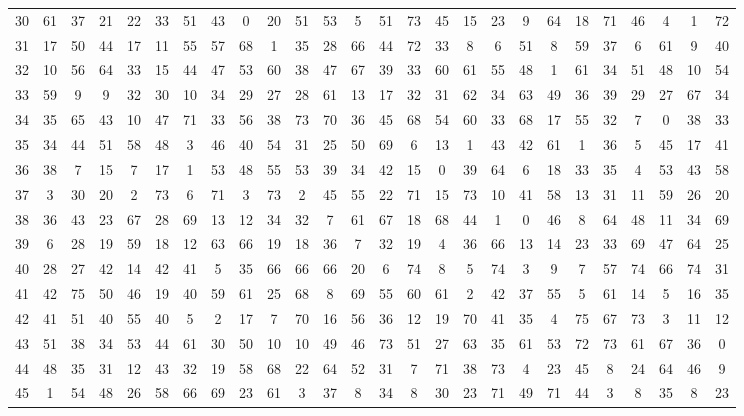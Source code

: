 \begin{table}
\begin{tabular}{c c c c c c c c c c c c c c c c c c c c c c c c c c }
30 & 61 & 37 & 21 & 22 & 33 & 51 & 43 & 0 & 20 & 51 & 53 & 5 & 51 & 73 & 45 & 15 & 23 & 9 & 64 & 18 & 71 & 46 & 4 & 1 & 72 \\
31 & 17 & 50 & 44 & 17 & 11 & 55 & 57 & 68 & 1 & 35 & 28 & 66 & 44 & 72 & 33 & 8 & 6 & 51 & 8 & 59 & 37 & 6 & 61 & 9 & 40 \\
32 & 10 & 56 & 64 & 33 & 15 & 44 & 47 & 53 & 60 & 38 & 47 & 67 & 39 & 33 & 60 & 61 & 55 & 48 & 1 & 61 & 34 & 51 & 48 & 10 & 54 \\
33 & 59 & 9 & 9 & 32 & 30 & 10 & 34 & 29 & 27 & 28 & 61 & 13 & 17 & 32 & 31 & 62 & 34 & 63 & 49 & 36 & 39 & 29 & 27 & 67 & 34 \\
34 & 35 & 65 & 43 & 10 & 47 & 71 & 33 & 56 & 38 & 73 & 70 & 36 & 45 & 68 & 54 & 60 & 33 & 68 & 17 & 55 & 32 & 7 & 0 & 38 & 33 \\
35 & 34 & 44 & 51 & 58 & 48 & 3 & 46 & 40 & 54 & 31 & 25 & 50 & 69 & 6 & 13 & 1 & 43 & 42 & 61 & 1 & 36 & 5 & 45 & 17 & 41 \\
36 & 38 & 7 & 15 & 7 & 17 & 1 & 53 & 48 & 55 & 53 & 39 & 34 & 42 & 15 & 0 & 39 & 64 & 6 & 18 & 33 & 35 & 4 & 53 & 43 & 58 \\
37 & 3 & 30 & 20 & 2 & 73 & 6 & 71 & 3 & 73 & 2 & 45 & 55 & 22 & 71 & 15 & 73 & 10 & 41 & 58 & 13 & 31 & 11 & 59 & 26 & 20 \\
38 & 36 & 43 & 23 & 67 & 28 & 69 & 13 & 12 & 34 & 32 & 7 & 61 & 67 & 18 & 68 & 44 & 1 & 0 & 46 & 8 & 64 & 48 & 11 & 34 & 69 \\
39 & 6 & 28 & 19 & 59 & 18 & 12 & 63 & 66 & 19 & 18 & 36 & 7 & 32 & 19 & 4 & 36 & 66 & 13 & 14 & 23 & 33 & 69 & 47 & 64 & 25 \\
40 & 28 & 27 & 42 & 14 & 42 & 41 & 5 & 35 & 66 & 66 & 66 & 20 & 6 & 74 & 8 & 5 & 74 & 3 & 9 & 7 & 57 & 74 & 66 & 74 & 31 \\
41 & 42 & 75 & 50 & 46 & 19 & 40 & 59 & 61 & 25 & 68 & 8 & 69 & 55 & 60 & 61 & 2 & 42 & 37 & 55 & 5 & 61 & 14 & 5 & 16 & 35 \\
42 & 41 & 51 & 40 & 55 & 40 & 5 & 2 & 17 & 7 & 70 & 16 & 56 & 36 & 12 & 19 & 70 & 41 & 35 & 4 & 75 & 67 & 73 & 3 & 11 & 12 \\
43 & 51 & 38 & 34 & 53 & 44 & 61 & 30 & 50 & 10 & 10 & 49 & 46 & 73 & 51 & 27 & 63 & 35 & 61 & 53 & 72 & 73 & 61 & 67 & 36 & 0 \\
44 & 48 & 35 & 31 & 12 & 43 & 32 & 19 & 58 & 68 & 22 & 64 & 52 & 31 & 7 & 71 & 38 & 73 & 4 & 23 & 45 & 8 & 24 & 64 & 46 & 9 \\
45 & 1 & 54 & 48 & 26 & 58 & 66 & 69 & 23 & 61 & 3 & 37 & 8 & 34 & 8 & 30 & 23 & 71 & 49 & 71 & 44 & 3 & 8 & 35 & 8 & 23 \\

\end{tabular}
\end{table}

